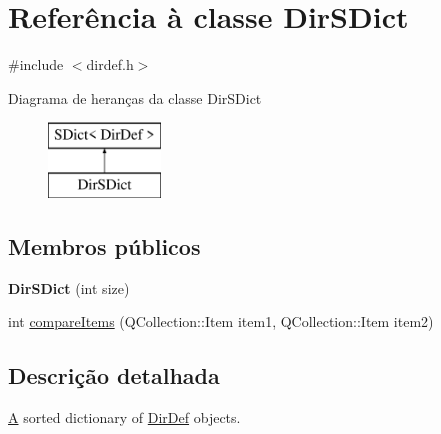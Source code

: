 \hypertarget{class_dir_s_dict}{\section{Referência à classe Dir\-S\-Dict}
\label{class_dir_s_dict}
}


{\ttfamily \#include $<$dirdef.\-h$>$}

Diagrama de heranças da classe Dir\-S\-Dict\begin{figure}[H]
\begin{center}
\leavevmode
\includegraphics[height=2.000000cm]{class_dir_s_dict}
\end{center}
\end{figure}
\subsection*{Membros públicos}
\begin{DoxyCompactItemize}
\item 
\hypertarget{class_dir_s_dict_a63b9efa64259a326e324792b83348b6d}{{\bfseries Dir\-S\-Dict} (int size)}\label{class_dir_s_dict_a63b9efa64259a326e324792b83348b6d}

\item 
int \hyperlink{class_dir_s_dict_a219450accf048597ffc7113ecde4c402}{compare\-Items} (Q\-Collection\-::\-Item item1, Q\-Collection\-::\-Item item2)
\end{DoxyCompactItemize}


\subsection{Descrição detalhada}
\hyperlink{class_a}{A} sorted dictionary of \hyperlink{class_dir_def}{Dir\-Def} objects. 

